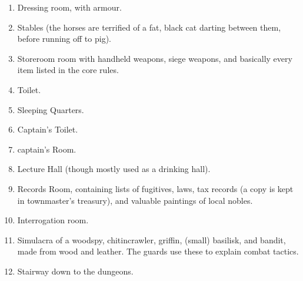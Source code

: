 \begin{multicols}{2}
\begin{enumerate}
  \item
  Dressing room, with armour.
  \label{stationDressing}
  \item
  Stables\label{stationStables} (the horses are terrified of a fat, black cat darting between them, before running off to \gls{pig}).
  \item
  Storeroom room with handheld weapons, siege weapons, and basically every item listed in the core rules.
  \label{stationStorage}
  \item
  Toilet.
  \label{stationToilet}
  \item
  Sleeping Quarters.
  \label{stationSleep}
  \item
  Captain's Toilet.
  \label{stationCaptainToilet}
  \item
  \gls{captain}'s Room.
  \label{stationCaptainRoom}
  \item
  Lecture Hall (though mostly used as a drinking hall).
  \label{stationLecture}
  \item
  Records Room, containing lists of fugitives, laws, tax records (a copy is kept in \gls{townmaster}'s treasury), and valuable paintings of local nobles.
  \label{stationRecords}
  \item
  Interrogation room.
  \label{stationInterrogation}
  \item
  Simulacra of a woodspy, chitincrawler, griffin, (small) basilisk, and bandit, made from wood and leather.
  The guards use these to explain combat tactics.
  \label{stationShrine}
  \item
  Stairway down to the dungeons.
  \label{stationStairs}
\end{enumerate}

\end{multicols}

\bigLine
